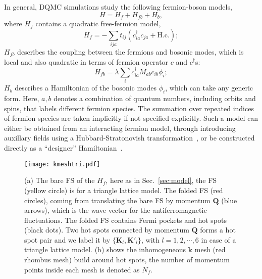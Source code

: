 \documentclass[aps,prx,twocolumn,superscriptaddress,showpacs,floatfix]{revtex4-1}
\renewcommand{\vec}[1]{\mathbf{#1}}
\begin{document}
In general, DQMC simulations study the following fermion-boson models,
\begin{equation}
\label{eq:Hgeneral}
H = H_f + H_{fb} + H_b,
\end{equation}
where $H_f$ contains a quadratic free-fermion model,
\begin{equation}
\label{eq:Hf}
H_f=-\sum_{ija}t_{ij}\left(c_{ia}^\dagger c_{ja}+\text{H.c.}\right);
\end{equation}
$H_{fb}$ describes the coupling between the fermions and bosonic modes, which is local and also quadratic in terms of fermion operator $c$ and $c^{\dagger}$s:
\begin{equation}
\label{eq:Hfb}
H_{fb}=\lambda\sum_ic_{ia}^\dagger M_{ab}c_{ib}\phi_i;
\end{equation}
$H_b$ describes a Hamiltonian of the bosonic modes $\phi_i$, which can take any generic form. Here, $a,b$ denotes a combination of quantum numbers, including orbits and spins, that labels different fermion species. The summation over repeated indices of fermion species are taken implicitly if not specified explicitly.
Such a model can either be obtained from an interacting fermion model, through introducing auxillary fields using a Hubbard-Stratonovish transformation~\cite{BSS1981,Hirsch_1983,AssaadEvertz2008}, or be constructed directly as a ``designer'' Hamiltonian~\cite{Xu2017,ZHLiu2017}.

\begin{figure}[htp!]
\centering
\texttt{[image: kmeshtri.pdf]}
\caption{(a) The bare FS of the $H_{f}$, here as in Sec.~\ref{sec:model}, the FS (yellow circle) is for a triangle lattice model. The folded FS (red circles), coming from translating the bare FS by momentum $\vec{Q}$ (blue arrows), which is the wave vector for the antiferromagnetic fluctuations. The folded FS contains Fermi pockets and hot spots (black dots). Two hot spots connected by momentum $\vec{Q}$ forms a hot spot pair and we label it by $\{\mathbf{K}_l,\mathbf{K'}_l\}$, with $l=1,2,\cdots,6$ in case of a triangle lattice model. (b) shows the inhomogeneous $\mathbf{k}$ mesh (red rhombus mesh) build around hot spots, the number of momentum points inside each mesh is denoted as $N_f$.}
\label{fig:FS}
\end{figure}
\end{document}
